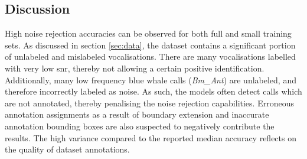 {%




\subsection{Discussion}
\label{sec:classification_discussion}
High noise rejection accuracies can be observed for both full and small training sets. As discussed in section \ref{sec:data}, the dataset contains a significant portion of unlabeled and mislabeled vocalisations. There are many vocalisations labelled with very low \ac{snr}, thereby not allowing a certain positive identification. Additionally, many low frequency blue whale calls (\textit{Bm\_Ant}) are unlabeled, and therefore incorrectly labeled as noise. As such, the models often detect calls which are not annotated, thereby penalising the noise rejection capabilities. Erroneous annotation assignments as a result of boundary extension and inaccurate annotation bounding boxes are also suspected to negatively contribute the results. The high variance compared to the reported median accuracy reflects on the quality of dataset annotations.

}
